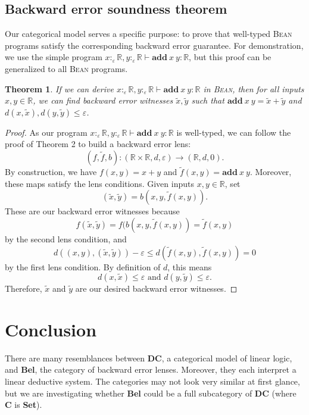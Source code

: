 \documentclass[a4paper]{article}
\newcommand{\DC}{\textbf{DC}}
\newcommand{\C}{\textbf{C}}
\newcommand{\Bel}{\textbf{Bel}}
\newcommand{\Bean}{\textsc{Bean}}
\newcommand{\R}{\mathbb{R}}
\newcommand{\add}[2]{\textbf{add}\ {#1}\ {#2}}
\newtheorem{theorem}{Theorem}
\begin{document}
\subsection{Backward error soundness theorem}
Our categorical model serves a specific purpose: to prove that well-typed \Bean{} programs satisfy the corresponding backward error guarantee. For demonstration, we use the simple program $x:_\varepsilon\R,y:_\varepsilon\R\vdash \add{x}{y}:\R$, but this proof can be generalized to all \Bean{} programs.
\begin{theorem}
    If we can derive $x:_\varepsilon\R,y:_\varepsilon\R\vdash \add{x}{y}:\R$ in \Bean{}, then for all inputs $x,y\in \R$, we can find backward error witnesses $\tilde{x},\tilde{y}$ such that $\add{x}{y}=\tilde{x}+\tilde{y}$ and $d(x,\tilde{x}), d(y,\tilde{y})\leq \varepsilon$.
\end{theorem}
\begin{proof}
    As our program $x:_\varepsilon\R,y:_\varepsilon\R\vdash \add{x}{y}:\R$ is well-typed, we can follow the proof of Theorem 2 to build a backward error lens:
    \begin{equation*}
        (f,\tilde{f},b):(\R\times\R,d,\varepsilon)\to (\R,d,0).
    \end{equation*}
    By construction, we have $f(x,y)=x+y$ and $\tilde{f}(x,y)=\add{x}{y}$. Moreover, these maps satisfy the lens conditions. Given inputs $x,y\in\R$, set 
    \begin{equation*}
        (\tilde{x},\tilde{y})=b(x,y,\tilde{f}(x,y)).
    \end{equation*}
    These are our backward error witnesses because 
    \begin{equation*}
        f(\tilde{x},\tilde{y})=f(b(x,y,\tilde{f}(x,y))=\tilde{f}(x,y)
    \end{equation*}
    by the second lens condition, and 
    \begin{equation*}
        d((x,y),(\tilde{x},\tilde{y}))-\varepsilon\leq d(\tilde{f}(x,y),\tilde{f}(x,y))=0
    \end{equation*}
    by the first lens condition. By definition of $d$, this means
    \begin{equation*}
        d(x,\tilde{x})\leq \varepsilon\text{ and }d(y,\tilde{y})\leq \varepsilon.
    \end{equation*}
    Therefore, $\tilde{x}$ and $\tilde{y}$ are our desired backward error witnesses.
\end{proof}

\section{Conclusion}
There are many resemblances between \DC{}, a categorical model of linear logic, and \Bel{}, the category of backward error lenses. Moreover, they each interpret a linear deductive system. The categories may not look very similar at first glance, but we are investigating whether \Bel{} could be a full subcategory of \DC{} (where \C{} is \textbf{Set}). 
\end{document}
